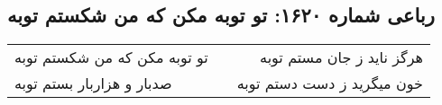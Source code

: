 \begin{center}
\section*{رباعی شماره ۱۶۲۰: تو توبه مکن که من شکستم توبه}
\label{sec:1620}
\begin{longtable}{l p{0.5cm} r}
تو توبه مکن که من شکستم توبه
&&
هرگز ناید ز جان مستم توبه
\\
صدبار و هزاربار بستم توبه
&&
خون میگرید ز دست دستم توبه
\\
\end{longtable}
\end{center}
